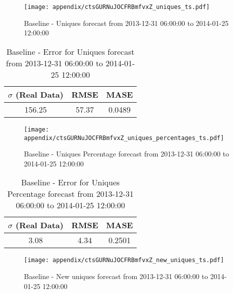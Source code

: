 \begin{figure}[H] \begin{center} \leavevmode
\texttt{[image: appendix/ctsGURNuJOCFRBmfvxZ\_uniques\_ts.pdf]} \caption{
Baseline - Uniques forecast from 2013-12-31 06:00:00 to 2014-01-25 12:00:00} \label{fig:appendix/ctsGURNuJOCFRBmfvxZ_uniques_ts.pdf} \end{center}
\end{figure}

\begin{table}[H]
\centering
\footnotesize
\begin{tabular}{ccc}
$\sigma$ (Real Data) & RMSE & MASE   \\ \hline
156.25 & 57.37 & 0.0489 \\
\end{tabular}

\vspace{0.5cm}

\caption{
Baseline - Error for Uniques forecast from 2013-12-31 06:00:00 to 2014-01-25 12:00:00}
\end{table}

\begin{figure}[H] \begin{center} \leavevmode
\texttt{[image: appendix/ctsGURNuJOCFRBmfvxZ\_uniques\_percentages\_ts.pdf]} \caption{
Baseline - Uniques Percentage forecast from 2013-12-31 06:00:00 to 2014-01-25 12:00:00} \label{fig:appendix/ctsGURNuJOCFRBmfvxZ_uniques_percentages_ts.pdf} \end{center}
\end{figure}

\begin{table}[H]
\centering
\footnotesize
\begin{tabular}{ccc}
$\sigma$ (Real Data) & RMSE & MASE   \\ \hline
3.08 & 4.34 & 0.2501 \\
\end{tabular}

\vspace{0.5cm}

\caption{
Baseline - Error for Uniques Percentage forecast from 2013-12-31 06:00:00 to 2014-01-25 12:00:00}
\end{table}

\begin{figure}[H] \begin{center} \leavevmode
\texttt{[image: appendix/ctsGURNuJOCFRBmfvxZ\_new\_uniques\_ts.pdf]} \caption{
Baseline - New uniques forecast from 2013-12-31 06:00:00 to 2014-01-25 12:00:00} \label{fig:appendix/ctsGURNuJOCFRBmfvxZ_new_uniques_ts.pdf} \end{center}
\end{figure}

